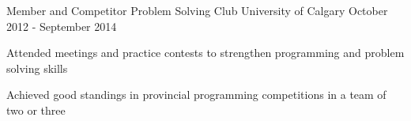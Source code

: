 \begin{cventries}
{\begin{cvitems}
      \end{cvitems}
    }
  \cventry
    {Member and Competitor}
    {Problem Solving Club}
    {University of Calgary}
    {October 2012 - September 2014}
    {
      \begin{cvitems}
        \item {Attended meetings and practice contests to strengthen programming and problem solving skills}
        \item {Achieved good standings in provincial programming competitions in a team of two or three}
      \end{cvitems}
    }
\end{cventries}
